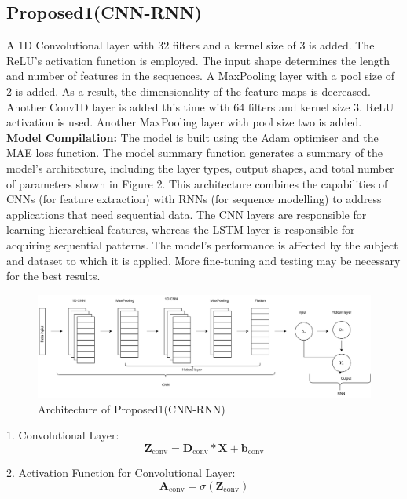 \documentclass[a4paper,fleqn]{cas-sc}
\begin{document}
\subsection{Proposed1(CNN-RNN)}A 1D Convolutional layer with 32 filters and a kernel size of 3 is added. The ReLU's activation function is employed. The input shape determines the length and number of features in the sequences. A MaxPooling layer with a pool size of 2 is added. As a result, the dimensionality of the feature maps is decreased. Another Conv1D layer is added this time with 64 filters and kernel size 3. ReLU activation is used.
Another MaxPooling layer with pool size two is added.\\
\textbf{Model Compilation:} The model is built using the Adam optimiser and the MAE loss function. The model summary function generates a summary of the model's architecture, including the layer types, output shapes, and total number of parameters shown in Figure 2. This architecture combines the capabilities of CNNs (for feature extraction) with RNNs (for sequence modelling) to address applications that need sequential data. The CNN layers are responsible for learning hierarchical features, whereas the LSTM layer is responsible for acquiring sequential patterns. The model's performance is affected by the subject and dataset to which it is applied. More fine-tuning and testing may be necessary for the best results.




\begin{figure}[!ht]
\centering
\includegraphics[width=\textwidth]{CNN-RNN (1)}
\caption{Architecture of Proposed1(CNN-RNN)}
\label{}
\end{figure}





1. Convolutional Layer:
\begin{equation}
\mathbf{Z}_{\text{conv}} = \mathbf{D}_{\text{conv}} * \mathbf{X} + \mathbf{b}_{\text{conv}}
\end{equation}

2. Activation Function for Convolutional Layer:
\begin{equation}
\mathbf{A}_{\text{conv}} = \sigma(\mathbf{Z}_{\text{conv}})
\end{equation}
\end{document}
